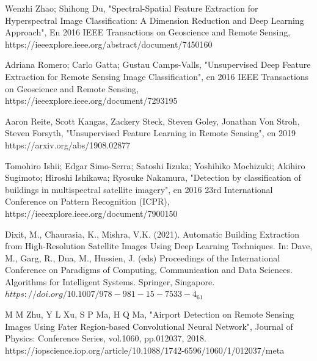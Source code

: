 \documentclass[article]{llncs}
\begin{document}
\begin{thebibliography}{8}
        Wenzhi Zhao; Shihong Du, "Spectral-Spatial Feature Extraction for Hyperspectral Image Classification: A Dimension Reduction and Deep Learning Approach", En 2016 IEEE Transactions on Geoscience and Remote Sensing, https://ieeexplore.ieee.org/abstract/document/7450160

        Adriana Romero; Carlo Gatta; Gustau Camps-Valls, "Unsupervised Deep Feature Extraction for Remote Sensing Image Classification", en 2016 IEEE Transactions on Geoscience and Remote Sensing, https://ieeexplore.ieee.org/document/7293195
    
        Aaron Reite, Scott Kangas, Zackery Steck, Steven Goley, Jonathan Von Stroh, Steven Forsyth, "Unsupervised Feature Learning in Remote Sensing", en 2019 https://arxiv.org/abs/1908.02877

        Tomohiro Ishii; Edgar Simo-Serra; Satoshi Iizuka; Yoshihiko Mochizuki; Akihiro Sugimoto; Hiroshi Ishikawa; Ryosuke Nakamura, "Detection by classification of buildings in multispectral satellite imagery", en 2016 23rd International Conference on Pattern Recognition (ICPR), https://ieeexplore.ieee.org/document/7900150
    
        Dixit, M., Chaurasia, K., Mishra, V.K. (2021). Automatic Building Extraction from High-Resolution Satellite Images Using Deep Learning Techniques. In: Dave, M., Garg, R., Dua, M., Hussien, J. (eds) Proceedings of the International Conference on Paradigms of Computing, Communication and Data Sciences. Algorithms for Intelligent Systems. Springer, Singapore. $https://doi.org/10.1007/978-981-15-7533-4_61$
        
        M M Zhu, Y L Xu, S P Ma, H Q Ma, "Airport Detection on Remote Sensing Images Using Fater Region-based Convolutional Neural Network", Journal of Physics: Conference Series, vol.1060, pp.012037, 2018. https://iopscience.iop.org/article/10.1088/1742-6596/1060/1/012037/meta

    



  \end{thebibliography}
\end{document}
